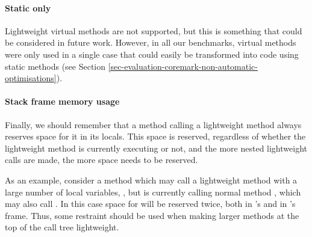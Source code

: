 \paragraph{Static only}
Lightweight virtual methods are not supported, but this is something that could be considered in future work. However, in all our benchmarks, virtual methods were only used in a single case that could easily be transformed into code using static methods (see Section \ref{sec-evaluation-coremark-non-automatic-optimisations}).

\paragraph{Stack frame memory usage}
Finally, we should remember that a method calling a lightweight method always reserves space for it in its locals. This space is reserved, regardless of whether the lightweight method is currently executing or not, and the more nested lightweight calls are made, the more space needs to be reserved.

As an example, consider a method  which may call a lightweight method with a large number of local variables, , but is currently calling normal method , which may also call . In this case space for  will be reserved twice, both in 's and in 's frame. Thus, some restraint should be used when making larger methods at the top of the call tree lightweight.

